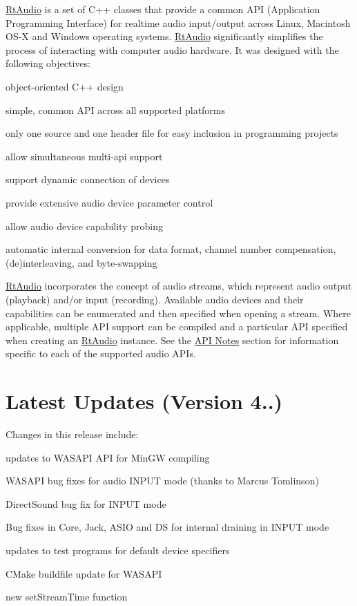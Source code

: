 \hyperlink{class_rt_audio}{Rt\+Audio} is a set of C++ classes that provide a common A\+PI (Application Programming Interface) for realtime audio input/output across Linux, Macintosh O\+S-\/X and Windows operating systems. \hyperlink{class_rt_audio}{Rt\+Audio} significantly simplifies the process of interacting with computer audio hardware. It was designed with the following objectives\+:


\begin{DoxyItemize}
\item object-\/oriented C++ design 
\item simple, common A\+PI across all supported platforms 
\item only one source and one header file for easy inclusion in programming projects 
\item allow simultaneous multi-\/api support 
\item support dynamic connection of devices 
\item provide extensive audio device parameter control 
\item allow audio device capability probing 
\item automatic internal conversion for data format, channel number compensation, (de)interleaving, and byte-\/swapping 
\end{DoxyItemize}

\hyperlink{class_rt_audio}{Rt\+Audio} incorporates the concept of audio streams, which represent audio output (playback) and/or input (recording). Available audio devices and their capabilities can be enumerated and then specified when opening a stream. Where applicable, multiple A\+PI support can be compiled and a particular A\+PI specified when creating an \hyperlink{class_rt_audio}{Rt\+Audio} instance. See the \hyperlink{tutorial.txt_apinotes}{A\+PI Notes} section for information specific to each of the supported audio A\+P\+Is.\hypertarget{index_whatsnew}{}\section{Latest Updates (\+Version 4..)}\label{index_whatsnew}
Changes in this release include\+:


\begin{DoxyItemize}
\item updates to W\+A\+S\+A\+PI A\+PI for Min\+GW compiling
\item W\+A\+S\+A\+PI bug fixes for audio I\+N\+P\+UT mode (thanks to Marcus Tomlinson)
\item Direct\+Sound bug fix for I\+N\+P\+UT mode
\item Bug fixes in Core, Jack, A\+S\+IO and DS for internal draining in I\+N\+P\+UT mode
\item updates to test programs for default device specifiers
\item C\+Make buildfile update for W\+A\+S\+A\+PI
\item new set\+Stream\+Time function
\end{DoxyItemize}

